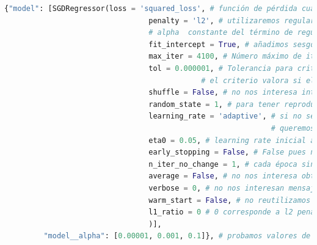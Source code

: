 \documentclass[11pt,a4paper]{article}
\theoremstyle{definition}
\begin{document}
	\begin{lstlisting}[language=Python, caption= Par\'ametros usados en \texttt{SGDRegressor}, inputencoding=latin1]
  {"model": [SGDRegressor(loss = 'squared_loss', # función de pérdida cuadrática
                                 penalty = 'l2', # utilizaremos regularización l2
                                 # alpha  constante del término de regularización (probaremos distintos valores mediante 5-fold cross validation)
                                 fit_intercept = True, # añadimos sesgo o intercept pues nuestra matriz aún no tiene columna de 1s 
                                 max_iter = 4100, # Número máximo de iteraciones arbitrario
                                 tol = 0.000001, # Tolerancia para criterio de parada por tolerancia (parar si loss > best_loss - tol tras n_iter_no_change épocas seguidas)
                                             # el criterio valora si el error es no mejora en 0.001 el mejor error hasta el momento. En nuestro caso esta condición por tolerancia se usará para learning_rate adaptativo
                                 shuffle = False, # no nos interesa introducir más ruido
                                 random_state = 1, # para tener reproducibilidad de los resultados
                                 learning_rate = 'adaptive', # si no se mejora resultado por criterio tolerancia (loss > best_loss - tol) tras n_iter_no_change épocas seguidas, entonces cambiamos learning rate por (learning rate)/5
                                                             # queremos evitar oscilación
                                 eta0 = 0.05, # learning rate inicial arbitrario, nos permitimos que sea un poco alto pues es adaptativo
                                 early_stopping = False, # False pues no queremos reservar más datos para validación
                                 n_iter_no_change = 1, # cada época sin mejora en crit. tolerancia se realizará la adaptación del learning rate (learning_rate='adaptive')
                                 average = False, # no nos interesa obtener media de pesos
                                 verbose = 0, # no nos interesan mensajes 
                                 warm_start = False, # no reutilizamos ninguna solución anterior durante la validación cruzada
                                 l1_ratio = 0 # 0 corresponde a l2 penalty, no se usará pues solo se usa si learning_rate = 'elasticnet'
                                 )],
         "model__alpha": [0.00001, 0.001, 0.1]}, # probamos valores de regularización arbitrarios dentro de los recomendados

	\end{lstlisting}
\end{document}

